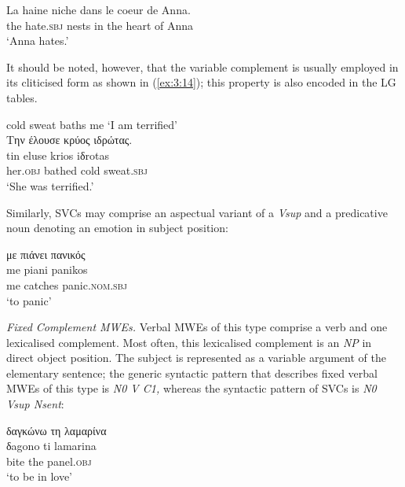 \documentclass[output=paper]{langsci/langscibook}
\begin{document}
\begin{exe}
\ex \label{ex:3:13}
\gll  La haine niche dans le coeur de Anna. \\
the hate.\textsc{sbj} nests in the heart of Anna\\
\glt ‘Anna hates.’
\end{exe}

It should be noted, however, that the variable complement is usually
employed in its cliticised form as shown in (\ref{ex:3:14}); this property is also
encoded in the LG tables. 

\begin{exe}
\ex \label{ex:3:14}
cold sweat baths me `I am terrified'\\
\glll  Tην έλουσε κρύος ιδρώτας. \\
 tin eluse krios iδrotas\\
her.\textsc{obj} bathed cold sweat.\textsc{sbj}\\
\glt %
‘She was terrified.’
\end{exe}

Similarly,  SVCs may comprise an aspectual variant of a \textit{Vsup} and a predicative noun denoting an emotion in subject position:

\begin{exe}
\ex \label{ex:3:15}
\glll  με πιάνει πανικός \\
me piani panikos\\
me catches panic.\textsc{nom.sbj}\\
\glt %
‘to panic’
\end{exe}

\textit{Fixed Complement MWEs.} Verbal MWEs of this type
comprise a verb and one lexicalised complement. Most often, this
lexicalised complement is an \textit{NP }in direct object
position. The subject is represented as a variable argument of the
elementary sentence; the generic syntactic pattern that describes fixed
verbal MWEs of this type is \textit{N0 V C1, }whereas the
syntactic pattern of SVCs is \textit{N0 Vsup Nsent}:

\begin{exe}
\ex \label{ex:3:16}
\glll   δαγκώνω τη λαμαρίνα \\
δagono ti lamarina\\
bite the panel.\textsc{obj}\\
\glt %
‘to be in love’
\end{exe}
\end{document}
